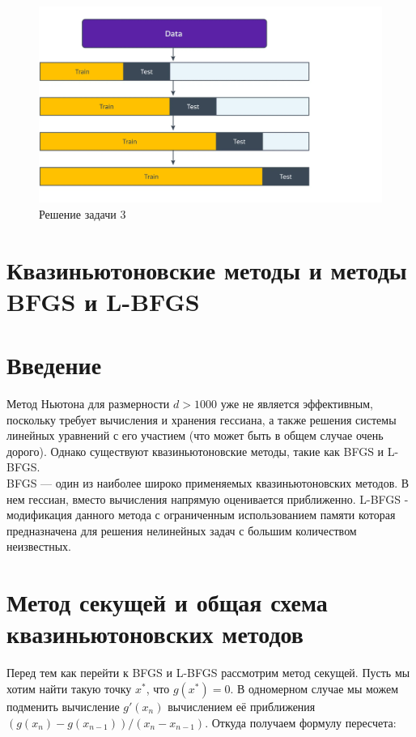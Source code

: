 \begin{figure}[h]
    \centering
    \includegraphics[width=\textwidth/2]{chapters/general/sol-3.png}
    \caption{Решение задачи 3}
    \label{img:sol-3}
\end{figure}





\section{Квазиньютоновские методы и методы BFGS и L-BFGS}
\section*{Введение}
Метод Ньютона для размерности $d > 1000$ уже не является эффективным, поскольку требует вычисления и хранения гессиана, а также решения системы линейных уравнений с его участием (что может быть в общем случае очень дорого). Однако существуют квазиньютоновские методы, такие как BFGS и L-BFGS. \\
BFGS — один из наиболее широко применяемых квазиньютоновских методов. В нем гессиан, вместо вычисления напрямую оценивается приближенно. L-BFGS - модификация данного метода с ограниченным использованием памяти которая предназначена для решения нелинейных задач с большим количеством неизвестных.



\section*{Метод секущей и общая схема квазиньютоновских методов}
Перед тем как перейти к  BFGS и L-BFGS рассмотрим метод секущей.
Пусть мы хотим найти такую точку $x^*$, что $g(x^*)=0$. В одномерном случае мы можем подменить вычисление $g'(x_n)$ вычислением её приближения $(g(x_n) - g(x_{n-1}))/(x_n - x_{n-1})$. Откуда получаем формулу пересчета:

